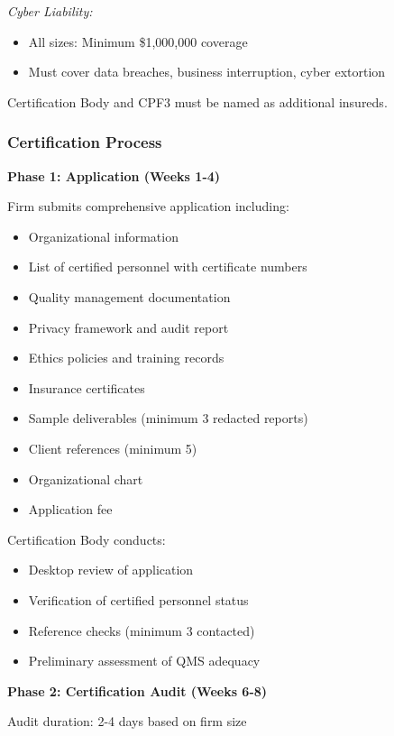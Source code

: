 \documentclass[11pt,a4paper]{article}
\begin{document}
\textit{Cyber Liability:}
\begin{itemize}
\item All sizes: Minimum \$1,000,000 coverage
\item Must cover data breaches, business interruption, cyber extortion
\end{itemize}

Certification Body and CPF3 must be named as additional insureds.

\subsubsection{Certification Process}

\textbf{Phase 1: Application (Weeks 1-4)}

Firm submits comprehensive application including:
\begin{itemize}
\item Organizational information
\item List of certified personnel with certificate numbers
\item Quality management documentation
\item Privacy framework and audit report
\item Ethics policies and training records
\item Insurance certificates
\item Sample deliverables (minimum 3 redacted reports)
\item Client references (minimum 5)
\item Organizational chart
\item Application fee
\end{itemize}

Certification Body conducts:
\begin{itemize}
\item Desktop review of application
\item Verification of certified personnel status
\item Reference checks (minimum 3 contacted)
\item Preliminary assessment of QMS adequacy
\end{itemize}

\textbf{Phase 2: Certification Audit (Weeks 6-8)}

Audit duration: 2-4 days based on firm size
\end{document}

